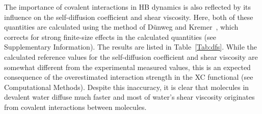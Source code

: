 \documentclass[journal=jacsat,manuscript=article]{achemso}
\newcommand{\Ang}{\ensuremath{\mathring{\text{A}}}}
\newcommand{\old}{\color{black}}
\begin{document}

The importance of covalent interactions in HB dynamics is also reflected by its influence on the self-diffusion coefficient and shear viscosity. 
Here, both of these quantities are calculated using the method of D\"unweg and Kremer~\cite{dunweg1993molecular}, which corrects for strong finite-size effects in the calculated quantities (see Supplementary Information). The results are listed in Table~\ref{Tab:dfs}. 
While the calculated reference values for the self-diffusion coefficient and shear viscosity are somewhat different from the experimental measured values, this is an expected consequence of the overestimated interaction strength in the XC functional (see Computational Methods). 
Despite this inaccuracy, it is clear that molecules in devalent water diffuse much faster and most of water's shear viscosity originates from covalent interactions between molecules.

\end{document}

